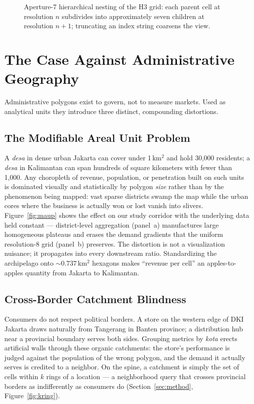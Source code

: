 \documentclass[11pt,a4paper,twocolumn]{article}
\begin{document}
\begin{figure}[!tp]
  \centering
  
  \caption{Aperture-7 hierarchical nesting of the H3 grid: each parent cell
    at resolution $n$ subdivides into approximately seven children at
    resolution $n{+}1$; truncating an index string coarsens the view.}
  \label{fig:hierarchy}
\end{figure}

\section{The Case Against Administrative Geography}
\label{sec:admin}

Administrative polygons exist to govern, not to measure markets. Used as
analytical units they introduce three distinct, compounding distortions.

\subsection{The Modifiable Areal Unit Problem}

A \emph{desa} in dense urban Jakarta can cover under 1\,km$^2$ and hold
30{,}000 residents; a \emph{desa} in Kalimantan can span hundreds of square
kilometers with fewer than 1{,}000. Any choropleth of revenue, population,
or penetration built on such units is dominated visually and statistically
by polygon \emph{size} rather than by the phenomenon being mapped: vast
sparse districts swamp the map while the urban cores where the business is
actually won or lost vanish into slivers. Figure~\ref{fig:maup} shows the
effect on our study corridor with the underlying data held constant ---
district-level aggregation (panel~a) manufactures large homogeneous
plateaus and erases the demand gradients that the uniform resolution-8
grid (panel~b) preserves. The distortion is not a visualization nuisance;
it propagates into every downstream ratio. Standardizing the archipelago
onto ${\sim}0.737$\,km$^2$ hexagons makes ``revenue per cell'' an
apples-to-apples quantity from Jakarta to Kalimantan.

\subsection{Cross-Border Catchment Blindness}

Consumers do not respect political borders. A store on the western edge of
DKI Jakarta draws naturally from Tangerang in Banten province; a
distribution hub near a provincial boundary serves both sides. Grouping
metrics by \emph{kota} erects artificial walls through these organic
catchments: the store's performance is judged against the population of
the wrong polygon, and the demand it actually serves is credited to a
neighbor. On the spine, a catchment is simply the set of cells within $k$
rings of a location --- a neighborhood query that crosses provincial
borders as indifferently as consumers do
(Section~\ref{sec:method}, Figure~\ref{fig:kring}).
\end{document}

